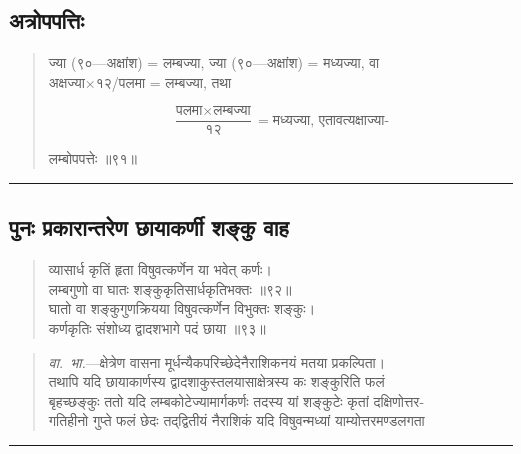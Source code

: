 \documentclass[11pt,a4paper]{article}
\newcommand{\longline}{\noindent\rule{\textwidth}{0.4pt}}
\newcommand{\dev}[1]{{\devanagarifont #1}}
\newenvironment{shloka}{%
  \begin{quote}
  \small
  \setlength{\leftmargin}{2em}
  \devanagarifont
}{\end{quote}}
\newenvironment{vyakhya}{%
  \begin{quote}
  \small
  \setlength{\leftmargin}{1em}
  \devanagarifont
}{\end{quote}}
\newcommand{\skt}[1]{{\devanagarifont #1}}
\begin{document}
\subsection{\dev{अत्रोपपत्तिः}}

\begin{vyakhya}
\skt{ज्या (९०—अक्षांश) = लम्बज्या, ज्या (९०—अक्षांश) = मध्यज्या, वा}\\
\skt{अक्षज्या$\times$१२/पलमा = लम्बज्या, तथा}

\begin{equation*}
\frac{\text{पलमा} \times \text{लम्बज्या}}{१२} = \text{मध्यज्या, एतावत्यक्षाज्या-}
\end{equation*}

\skt{लम्बोपपत्तेः ॥९१॥}
\end{vyakhya}

\longline

\subsection{\dev{पुनः प्रकारान्तरेण छायाकर्णी शङ्कु वाह}}

\begin{shloka}
\skt{व्यासार्ध कृतिं हृता विषुवत्कर्णेन या भवेत् कर्णः।}\\
\skt{लम्बगुणो वा घातः शङ्कुकृतिसार्धकृतिभक्तः ॥९२॥}\\[0.3em]
\skt{घातो वा शङ्कुगुणक्रियया विषुवत्कर्णेन विभुक्तः शङ्कुः।}\\
\skt{कर्णकृतिः संशोध्य द्वादशभागे पदं छाया ॥९३॥}
\end{shloka}

\begin{vyakhya}
\textit{वा.\ भा.}—\skt{क्षेत्रेण वासना मूर्धन्यैकपरिच्छेदेनैराशिकनयं मतया प्रकल्पिता।}\\
\skt{तथापि यदि छायाकार्णस्य द्वादशाकुस्तलयासाक्षेत्रस्य कः शङ्कुरिति फलं}\\
\skt{बृहच्छङ्कुः ततो यदि लम्बकोटेज्यामार्गकर्णः तदस्य यां शङ्कुटेः कृतां दक्षिणोत्तर-}\\
\skt{गतिहीनो गुप्ते फलं छेदः तद्‌द्वितीयं नैराशिकं यदि विषुवन्मध्यां याम्योत्तरमण्डलगता}
\end{vyakhya}

\longline

\end{document}
